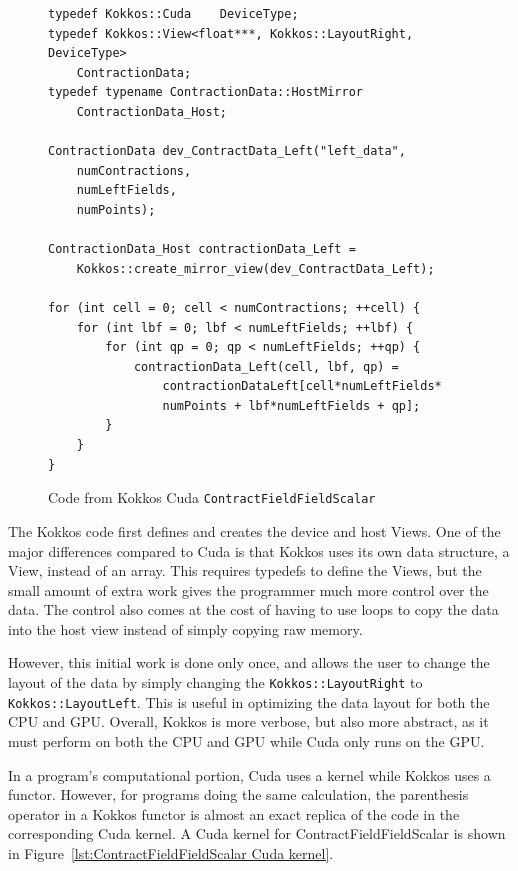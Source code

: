 \begin{figure}[!htb]
	\begin{lstlisting}
typedef Kokkos::Cuda	DeviceType;
typedef Kokkos::View<float***, Kokkos::LayoutRight, DeviceType>
	ContractionData;
typedef typename ContractionData::HostMirror
	ContractionData_Host;

ContractionData dev_ContractData_Left("left_data",
	numContractions,
	numLeftFields,
	numPoints);

ContractionData_Host contractionData_Left = 
	Kokkos::create_mirror_view(dev_ContractData_Left);

for (int cell = 0; cell < numContractions; ++cell) {
	for (int lbf = 0; lbf < numLeftFields; ++lbf) {
		for (int qp = 0; qp < numLeftFields; ++qp) {
			contractionData_Left(cell, lbf, qp) = 
				contractionDataLeft[cell*numLeftFields*
				numPoints + lbf*numLeftFields + qp];
		}
	}
}
	\end{lstlisting}
\caption{Code from Kokkos Cuda \texttt{ContractFieldFieldScalar}
\label{lst:ContractFieldFieldScalar Kokkos Cuda Data Setup}}
\end{figure}

The Kokkos code first defines and creates the device and host Views. One of the
major differences compared to Cuda is that Kokkos uses its own data structure, a
View, instead of an array. This requires typedefs to define the
Views, but the small amount of extra work gives the
programmer much more control over the data. The control also comes at the cost
of having to use loops to copy the data into the host view instead of simply
copying raw memory.

However, this initial work is done only once, and allows the user to change the
layout of the data by simply changing the \texttt{Kokkos::LayoutRight} to
\texttt{Kokkos::LayoutLeft}.  This is useful in optimizing the data layout for both the
CPU and GPU. Overall, Kokkos is more verbose, but also more abstract, as it must
perform on both the CPU and GPU while Cuda only runs on the GPU. 

In a program's computational portion, Cuda uses a kernel while Kokkos uses a
functor.  However, for programs doing the same calculation, the parenthesis
operator in a Kokkos functor is almost an exact replica of the code in
the corresponding Cuda kernel. A Cuda kernel for ContractFieldFieldScalar is
shown in Figure~\ref{lst:ContractFieldFieldScalar Cuda kernel}.

